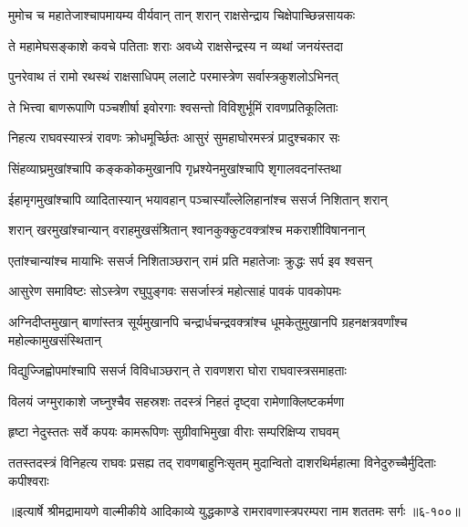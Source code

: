 \twolineshloka
{मुमोच च महातेजाश्चापमायम्य वीर्यवान्}
{तान् शरान् राक्षसेन्द्राय चिक्षेपाच्छिन्नसायकः} %

\twolineshloka
{ते महामेघसङ्काशे कवचे पतिताः शराः}
{अवध्ये राक्षसेन्द्रस्य न व्यथां जनयंस्तदा} %

\twolineshloka
{पुनरेवाथ तं रामो रथस्थं राक्षसाधिपम्}
{ललाटे परमास्त्रेण सर्वास्त्रकुशलोऽभिनत्} %

\twolineshloka
{ते भित्त्वा बाणरूपाणि पञ्चशीर्षा इवोरगाः}
{श्वसन्तो विविशुर्भूमिं रावणप्रतिकूलिताः} %

\twolineshloka
{निहत्य राघवस्यास्त्रं रावणः क्रोधमूर्च्छितः}
{आसुरं सुमहाघोरमस्त्रं प्रादुश्चकार सः} %

\twolineshloka
{सिंहव्याघ्रमुखांश्चापि कङ्ककोकमुखानपि}
{गृध्रश्येनमुखांश्चापि शृगालवदनांस्तथा} %

\twolineshloka
{ईहामृगमुखांश्चापि व्यादितास्यान् भयावहान्}
{पञ्चास्याँल्लेलिहानांश्च ससर्ज निशितान् शरान्} %

\twolineshloka
{शरान् खरमुखांश्चान्यान् वराहमुखसंश्रितान्}
{श्वानकुक्कुटवक्त्रांश्च मकराशीविषाननान्} %

\twolineshloka
{एतांश्चान्यांश्च मायाभिः ससर्ज निशिताञ्छरान्}
{रामं प्रति महातेजाः क्रुद्धः सर्प इव श्वसन्} %

\twolineshloka
{आसुरेण समाविष्टः सोऽस्त्रेण रघुपुङ्गवः}
{ससर्जास्त्रं महोत्साहं पावकं पावकोपमः} %

\threelineshloka
{अग्निदीप्तमुखान् बाणांस्तत्र सूर्यमुखानपि}
{चन्द्रार्धचन्द्रवक्त्रांश्च धूमकेतुमुखानपि}
{ग्रहनक्षत्रवर्णांश्च महोल्कामुखसंस्थितान्} %

\twolineshloka
{विद्युज्जिह्वोपमांश्चापि ससर्ज विविधाञ्छरान्}
{ते रावणशरा घोरा राघवास्त्रसमाहताः} %

\twolineshloka
{विलयं जग्मुराकाशे जघ्नुश्चैव सहस्रशः}
{तदस्त्रं निहतं दृष्ट्वा रामेणाक्लिष्टकर्मणा} %

\twolineshloka
{हृष्टा नेदुस्ततः सर्वे कपयः कामरूपिणः}
{सुग्रीवाभिमुखा वीराः सम्परिक्षिप्य राघवम्} %

\twolineshloka
{ततस्तदस्त्रं विनिहत्य राघवः प्रसह्य तद् रावणबाहुनिःसृतम्}
{मुदान्वितो दाशरथिर्महात्मा विनेदुरुच्चैर्मुदिताः कपीश्वराः} %


॥इत्यार्षे श्रीमद्रामायणे वाल्मीकीये आदिकाव्ये युद्धकाण्डे रामरावणास्त्रपरम्परा नाम शततमः सर्गः ॥६-१००॥
